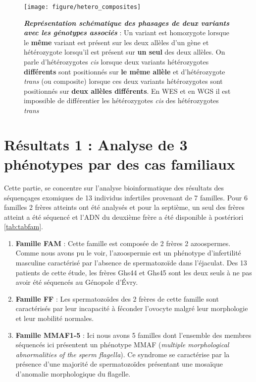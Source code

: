 \documentclass[12pt,twoside]{ugathesis}
\begin{document}
\begin{figure}

{\centering \texttt{[image: figure/hetero\_composites]} 

}

\caption[Représentation schématique des phasages de deux variants avec les génotypes associés]{\textbf{\emph{Représentation schématique des
phasages de deux variants avec les génotypes associés}} : Un variant est
homozygote lorsque le \textbf{même} variant est présent sur les deux
allèles d'un gène et hétérozygote lorsqu'il est présent sur \textbf{un
seul} des deux allèles. On parle d'hétérozygotes \emph{cis} lorsque deux
variants hétérozygotes \textbf{différents} sont positionnés sur
\textbf{le même allèle} et d'hétérozygote \emph{trans} (ou composite)
lorsque ces deux variants hétérozygotes sont positionnés sur
\textbf{deux allèles différents}. En WES et en WGS il est impossible de
différentier les hétérozygotes \emph{cis} des hétérozygotes \emph{trans}}\label{fig:piccompositehet}
\end{figure}












\newpage

\section{Résultats 1 : Analyse de 3 phénotypes par des cas
familiaux}\label{resultats-1-analyse-de-3-phenotypes-par-des-cas-familiaux}

Cette partie, se concentre sur l'analyse bioinformatique des résultats
des séquençages exomiques de 13 individus infertiles provenant de 7
familles. Pour 6 familles 2 frères atteints ont été analysés et pour la
septième, un seul des frères atteint a été séquencé et l'ADN du deuxième
frère a été disponible à postériori \ref{tab:tabfam}.

\begin{enumerate}
\def\labelenumi{\arabic{enumi}.}
\item
  \textbf{Famille FAM} : Cette famille est composée de 2 frères 2
  azoospermes. Comme nous avons pu le voir, l'azoospermie est un
  phénotype d'infertilité masculine caractérisé par l'absence de
  spermatozoïde dans l'éjaculat. Des 13 patients de cette étude, les
  frères Ghs44 et Ghs45 sont les deux seuls à ne pas avoir été séquencés
  au Génopole d'Évry.
\item
  \textbf{Famille FF} : Les spermatozoïdes des 2 frères de cette famille
  sont caractérisés par leur incapacité à féconder l'ovocyte malgré leur
  morphologie et leur mobilité normales.
\item
  \textbf{Famille MMAF1-5} : Ici nous avons 5 familles dont l'ensemble
  des membres séquencés ici présentent un phénotype MMAF (\emph{multiple
  morphological abnormalities of the sperm flagella}). Ce syndrome se
  caractérise par la présence d'une majorité de spermatozoïdes
  présentant une mosaïque d'anomalie morphologique du flagelle.
\end{enumerate}
\end{document}
